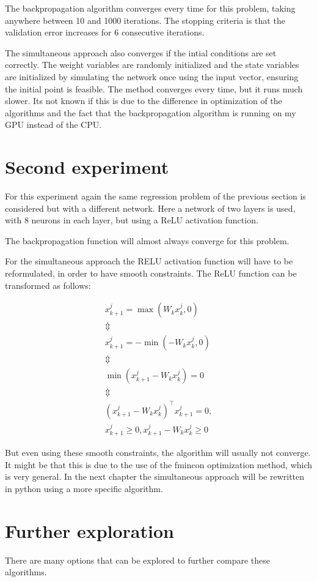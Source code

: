 The backpropagation algorithm converges every time for this problem, taking anywhere between 10 and 1000 iterations. The stopping criteria is that the validation error increases for 6 consecutive iterations.

The simultaneous approach also converges if the intial conditions are set correctly. The weight variables are randomly initialized and the state variables are initialized by simulating the network once using the input vector, ensuring the initial point is feasible. The method converges every time, but it runs much slower. Its not known if this is due to the difference in optimization of the algorithms and the fact that the backpropagation algorithm is running on my GPU instead of the CPU.

\section{Second experiment}
For this experiment again the same regression problem of the previous section is considered but with a different network. Here a network of two layers is used, with 8 neurons in each layer, but using a ReLU activation function. 

The backpropagation function will almost always converge for this problem.

For the simultaneous approach the RELU activation function will have to be reformulated, in order to have smooth constraints. The ReLU function can be transformed as follows:

   \begin{gather*}
   x_{k+1}^j = \max(W_kx_k^j,0) \\
   \Updownarrow \\
   x_{k+1}^j = -\min(-W_kx_k^j,0) \\
   \Updownarrow \\
   \min(x_{k+1}^j-W_kx_k^j) = 0 \\
   \Updownarrow \\
   (x_{k+1}^j-W_kx_k^j)^\top x_{k+1}^j = 0,\\
   x_{k+1}^j\geq 0,x_{k+1}^j-W_kx_k^j\geq 0
   \end{gather*}
   
But even using these smooth constraints, the algorithm will usually not converge. It might be that this is due to the use of the fmincon optimization method, which is very general. In the next chapter the simultaneous approach will be rewritten in python using a more specific algorithm.

\section{Further exploration}
There are many options that can be explored to further compare these algorithms.

